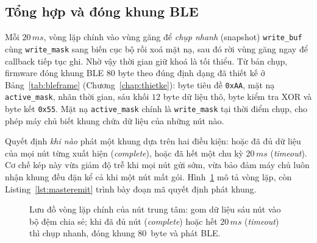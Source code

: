 \documentclass[../DoAn.tex]{subfiles}
\begin{document}
\subsection{Tổng hợp và đóng khung BLE}
Mỗi $20\,\si{ms}$, vòng lặp chính vào vùng găng để \emph{chụp nhanh} (snapshot) \texttt{write\_buf} cùng \texttt{write\_mask} sang biến cục bộ rồi xoá mặt nạ, sau đó rời vùng găng ngay để callback tiếp tục ghi. Nhờ vậy thời gian giữ khoá là tối thiểu. Từ bản chụp, firmware đóng khung BLE $80$ byte theo đúng định dạng đã thiết kế ở Bảng~\ref{tab:bleframe} (Chương~\ref{chap:thietke}): byte tiêu đề \texttt{0xAA}, mặt nạ \texttt{active\_mask}, nhãn thời gian, sáu khối $12$ byte dữ liệu thô, byte kiểm tra XOR và byte kết \texttt{0x55}. Mặt nạ \texttt{active\_mask} chính là \texttt{write\_mask} tại thời điểm chụp, cho phép máy chủ biết khung chứa dữ liệu của những nút nào.

Quyết định \emph{khi nào} phát một khung dựa trên hai điều kiện: hoặc đã đủ dữ liệu của mọi nút từng xuất hiện (\emph{complete}), hoặc đã hết một chu kỳ $20\,\si{ms}$ (\emph{timeout}). Cơ chế kép này vừa giảm độ trễ khi mọi nút gửi sớm, vừa bảo đảm máy chủ luôn nhận khung đều đặn kể cả khi một nút mất gói. Hình~\ref{fig:master_flow} mô tả vòng lặp, còn Listing~\ref{lst:masteremit} trình bày đoạn mã quyết định phát khung.

\begin{figure}[H]
    \centering
    \caption{Lưu đồ vòng lặp chính của nút trung tâm: gom dữ liệu sáu nút vào bộ đệm chia sẻ; khi đã đủ nút (\emph{complete}) hoặc hết $20\,\si{ms}$ (\emph{timeout}) thì chụp nhanh, đóng khung $80$~byte và phát BLE.}
    \label{fig:master_flow}
\end{figure}
\end{document}
